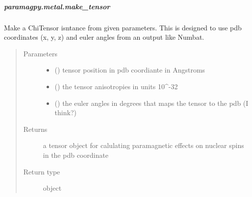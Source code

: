 \documentclass[a4paper,10pt,english,openany,oneside]{sphinxmanual}
\begin{document}
\subparagraph{paramagpy.metal.make\_tensor}
\label{\detokenize{reference/generated/paramagpy.metal.make_tensor:paramagpy-metal-make-tensor}}\label{\detokenize{reference/generated/paramagpy.metal.make_tensor::doc}}

\begin{fulllineitems}
\label{\detokenize{reference/generated/paramagpy.metal.make_tensor:paramagpy.metal.make_tensor}}
Make a ChiTensor isntance from given parameters.
This is designed to use pdb coordinates (x, y, z) and euler angles
from an output like Numbat.
\begin{quote}\begin{description}
\item[{Parameters}] \leavevmode\begin{itemize}
\item {} 
\sphinxstyleliteralstrong{\sphinxupquote{, }} (\sphinxstyleliteralemphasis{\sphinxupquote{,}}) \textendash{} tensor position in pdb coordiante in Angstroms

\item {} 
 (\sphinxstyleliteralemphasis{\sphinxupquote{,}}) \textendash{} the tensor anisotropies in units 10\textasciicircum{}-32

\item {} 
\sphinxstyleliteralstrong{\sphinxupquote{, }} (\sphinxstyleliteralemphasis{\sphinxupquote{,}}) \textendash{} the euler angles in degrees that maps the tensor
to the pdb (I think?)

\end{itemize}

\item[{Returns}] \leavevmode
{} \textendash{} a tensor object for calulating paramagnetic effects on
nuclear spins in the pdb coordinate

\item[{Return type}] \leavevmode
object {\hyperref[\detokenize{reference/generated/paramagpy.metal.Metal:paramagpy.metal.Metal}]{}}

\end{description}\end{quote}

\end{fulllineitems}
\end{document}
